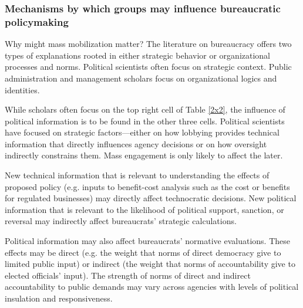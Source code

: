 \subsubsection{Mechanisms by which groups may influence bureaucratic policymaking}


Why might mass mobilization matter? The literature on bureaucracy offers two types of explanations rooted in either strategic behavior or organizational processes and norms. Political scientists often focus on strategic context. Public administration and management scholars focus on organizational logics and identities. 

While scholars often focus on the top right cell of Table \ref{2x2}, the influence of political information is to be found in the other three cells. Political scientists have focused on strategic factors---either on how lobbying provides technical information that directly influences agency decisions or on how oversight indirectly constrains them.  Mass engagement is only likely to affect the later.

New technical information that is relevant to understanding the effects of proposed policy (e.g. inputs to benefit-cost analysis such as the cost or benefits for regulated businesses) may directly affect technocratic decisions. 
New political information that is relevant to the likelihood of political support, sanction, or reversal may indirectly affect bureaucrats' strategic calculations.

Political information may also affect bureaucrats' normative evaluations. These effects may be
direct (e.g. the weight that norms of direct democracy give to limited public input) or 
indirect (the weight that norms of accountability give to elected officials' input).
The strength of norms of direct and indirect accountability to public demands may vary across agencies with levels of political insulation and responsiveness.

